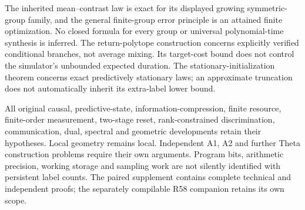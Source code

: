 The inherited mean--contrast law is exact for its displayed growing
symmetric-group family, and the general finite-group error principle
is an attained finite optimization.  No closed formula for every group
or universal polynomial-time synthesis is inferred.  The return-polytope
construction concerns explicitly verified conditional branches, not
average mixing.  Its target-cost bound does not control the simulator's
unbounded expected duration.  The stationary-initialization theorem
concerns exact predictively stationary laws; an approximate truncation
does not automatically inherit its extra-label lower bound.

All original causal, predictive-state, information-compression, finite
resource, finite-order measurement, two-stage reset, rank-constrained
discrimination, communication, dual, spectral and geometric developments
retain their hypotheses.  Local geometry remains local.  Independent
A1, A2 and further Theta construction problems require their own
arguments.  Program bits, arithmetic precision, working storage and
sampling work are not silently identified with persistent label counts.
The paired supplement contains complete technical and independent
proofs; the separately compilable R58 companion retains its own scope.

\renewcommand{\bibliofont}{\footnotesize\setlength{\baselineskip}{10.8pt}}


